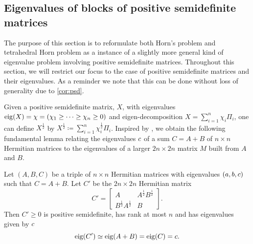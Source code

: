 \documentclass[notitlepage, 10pt]{article}
\begin{document}
\subsection{Eigenvalues of blocks of positive semidefinite matrices}
\label{sec:blocks_of_psd_matrices}

The purpose of this section is to reformulate both Horn's problem and tetrahedral Horn problem as a instance of a slightly more general kind of eigenvalue problem involving positive semidefinite matrices.
Throughout this section, we will restrict our focus to the case of positive semidefinite matrices and their eigenvalues.
As a reminder we note that this can be done without loss of generality due to \cref{cor:psd}.

Given a positive semidefinite matrix, $X$, with eigenvalues $\operatorname{eig}(X) = \chi = (\chi_1 \geq \cdots \geq \chi_n \geq 0)$ and eigen-decomposition $X = {\sum}_{i=1}^{n} \chi_i \Pi_i$, one can define $X^{\frac{1}{2}}$ by $X^{\frac{1}{2}} \coloneqq {\sum}_{i=1}^{n} \chi_i^{\frac{1}{2}} \Pi_i$.
Inspired by \cite[Theorem IV.2.13]{bhatia1997matrix}, we obtain the following fundamental lemma relating the eigenvalues $c$ of a sum $C=A+B$ of $n\times n$ Hermitian matrices to the eigenvalues of a larger $2n\times 2n$ matrix $M$ built from $A$ and $B$.
\begin{lem}
    \label{lem:trigonal_block}
    Let $(A, B, C)$ be a triple of $n \times n$ Hermitian matrices with eigenvalues $(a, b, c)$ such that $C=A+B$.
    Let $C'$ be the $2n \times 2n$ Hermitian matrix
    \begin{equation}
        C' = \begin{bmatrix}
            A & A^{\frac{1}{2}}B^{\frac{1}{2}} \\
            B^{\frac{1}{2}}A^{\frac{1}{2}} & B
        \end{bmatrix}.
    \end{equation}
    Then $C' \geq 0$ is positive semidefinite, has rank at most $n$ and has eigenvalues given by $c$
    \begin{equation}
        \operatorname{eig}(C') \simeq \operatorname{eig}(A+B) = \operatorname{eig}(C) = c.
    \end{equation}
\end{lem}
\end{document}
